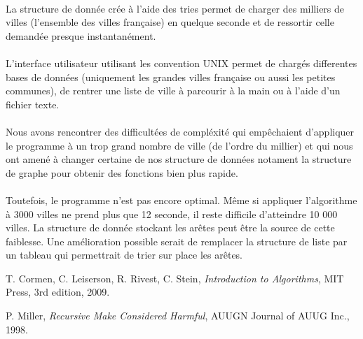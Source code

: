 \documentclass[a4paper]{article}
\begin{document}
\paragraph*{}
La structure de donnée crée à l'aide des tries permet de charger des milliers de villes (l'ensemble des villes française) en quelque seconde et de ressortir celle demandée presque instantanément.
\paragraph*{}
L'interface utilisateur utilisant les convention UNIX permet de chargés differentes bases de données (uniquement les grandes villes française ou aussi les petites communes), de rentrer une liste de ville à parcourir à la main ou à l'aide d'un fichier texte.
\paragraph*{}
Nous avons rencontrer des difficultées de compléxité qui empêchaient d'appliquer le programme à un trop grand nombre de ville (de l'ordre du millier) et qui nous ont amené à changer certaine de nos structure de données notament la structure de graphe pour obtenir des fonctions bien plus rapide.
\paragraph*{}
Toutefois, le programme n'est pas encore optimal. Même si appliquer l'algorithme à 3000 villes ne prend plus que 12 seconde, il reste difficile d'atteindre 10 000 villes. La structure de donnée stockant les arêtes peut être la source de cette faiblesse. Une amélioration possible serait de remplacer la structure de liste par un tableau qui permettrait de trier sur place les arêtes.


\begin{thebibliography}{00}

  T. Cormen, C. Leiserson, R. Rivest, C. Stein,
  \textit{Introduction to Algorithms},
  MIT Press,
  3rd edition,
  2009.

  P. Miller,
  \textit{Recursive Make Considered Harmful},
  AUUGN Journal of AUUG Inc.,
  1998.

\end{thebibliography}
\end{document}
